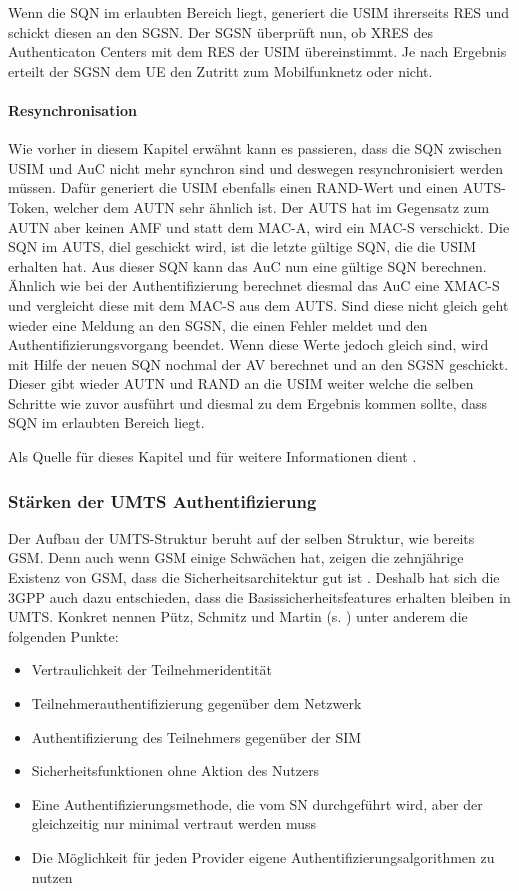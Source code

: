  Wenn die SQN im erlaubten Bereich liegt, generiert die USIM ihrerseits RES und schickt diesen an
 den SGSN. Der SGSN überprüft nun, ob XRES des Authenticaton Centers mit dem RES der USIM
 übereinstimmt. Je nach Ergebnis erteilt der SGSN dem \ac{UE} den Zutritt zum Mobilfunknetz oder
 nicht.
 
 \paragraph{Resynchronisation}
  Wie vorher in diesem Kapitel erwähnt kann es passieren, dass die SQN zwischen USIM und AuC
  nicht mehr synchron sind und deswegen resynchronisiert werden müssen. Dafür generiert die
  USIM ebenfalls einen RAND-Wert und einen AUTS-Token, welcher dem AUTN sehr ähnlich ist.
  Der AUTS hat im Gegensatz zum AUTN aber keinen AMF und statt dem MAC-A, wird ein MAC-S
  verschickt. Die SQN im AUTS, diel geschickt wird, ist die letzte gültige SQN, die die USIM erhalten
  hat. Aus dieser SQN kann das AuC nun eine gültige SQN berechnen. \\
  Ähnlich wie bei der Authentifizierung berechnet diesmal das AuC eine XMAC-S und vergleicht
  diese mit dem MAC-S aus dem AUTS. Sind diese nicht gleich geht wieder eine Meldung an den
  SGSN, die einen Fehler meldet und den Authentifizierungsvorgang beendet. Wenn diese Werte
  jedoch gleich sind, wird mit Hilfe der neuen SQN nochmal der AV berechnet und an den SGSN
  geschickt. Dieser gibt wieder AUTN und RAND an die USIM weiter welche die selben Schritte
  wie zuvor ausführt und diesmal zu dem Ergebnis kommen sollte, dass SQN im erlaubten
  Bereich liegt.
  
  Als Quelle für dieses Kapitel und für weitere Informationen dient \cite{3gpp.33.102}.
  
 \subsubsection{Stärken der UMTS Authentifizierung}
 Der Aufbau der \ac{UMTS}-Struktur beruht auf der selben Struktur, wie bereits \ac{GSM}.
 Denn auch wenn GSM einige Schwächen hat, zeigen die zehnjährige Existenz von GSM,
 dass die Sicherheitsarchitektur gut ist \cite{putz01}. Deshalb hat sich die \ac{3GPP} auch
 dazu entschieden, dass die Basis\-sicherheits\-features erhalten bleiben in UMTS. Konkret
 nennen Pütz, Schmitz und Martin (s. \cite{putz01}) unter anderem die folgenden Punkte:
 
 \begin{itemize}
  \item Vertraulichkeit der Teilnehmeridentität
  \item Teilnehmerauthentifizierung gegenüber dem Netzwerk
  \item Authentifizierung des Teilnehmers gegenüber der SIM
  \item Sicherheitsfunktionen ohne Aktion des Nutzers
  \item Eine Authentifizierungsmethode, die vom \ac{SN} durchgeführt wird, aber der gleichzeitig nur minimal vertraut werden muss
  \item Die Möglichkeit für jeden Provider eigene Authentifizierungsalgorithmen zu nutzen
 \end{itemize}
 
